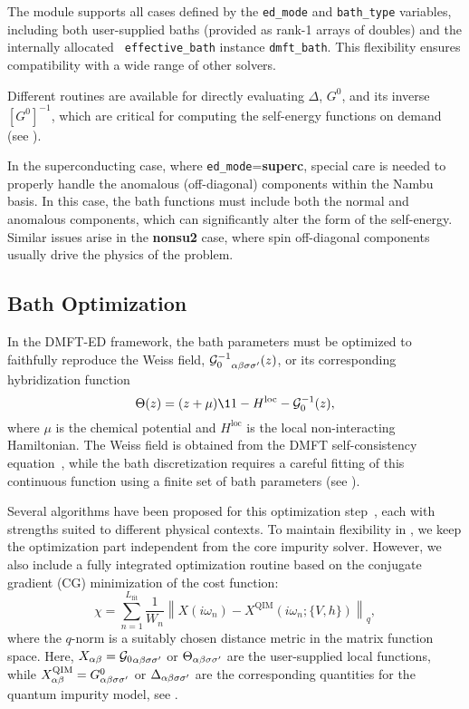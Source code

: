 \documentclass[edipack_sp.tex]{subfiles}
\begin{document}
The module supports all cases defined by the {\tt ed\_mode} and 
{\tt bath\_type} variables, including both user-supplied baths (provided 
as rank-1 arrays of doubles) and the internally allocated {\tt 
effective\_bath} instance {\tt dmft\_bath}. This flexibility ensures 
compatibility with a wide range of other solvers.

Different routines are available for directly evaluating $\Delta$, 
$G^0$, and its inverse $[G^0]^{-1}$, which are critical for computing 
the self-energy functions on demand (see ). 

In the superconducting case, where {\tt ed\_mode}={\bf superc}, 
special care is needed to properly handle the anomalous (off-diagonal) 
components within the Nambu basis. In this case, the bath functions 
must include both the normal and anomalous components, 
which can significantly alter the form of the self-energy. Similar issues arise in the {\bf nonsu2} case, where spin off-diagonal components usually drive the physics of the problem.




\subsection{Bath Optimization}\label{sSecFit}
In the DMFT-ED framework, the bath parameters must be optimized to 
faithfully reproduce the Weiss field, 
${{\cal G}^{-1}_{0}}_{\alpha\beta\sigma\sigma'}(z)$, or its corresponding hybridization 
function 
\begin{equation}
\Theta(z) = (z + \mu)\11 - H^\mathrm{loc} - \GG_0^{-1}(z),
\end{equation}
where $\mu$ is the chemical potential and $H^\mathrm{loc}$ is the 
local non-interacting Hamiltonian. The Weiss field is obtained from the DMFT 
self-consistency equation~\cite{Georges1996RMP}, while the bath 
discretization requires a careful fitting of this continuous function 
using a finite set of bath parameters (see ).

Several algorithms have been proposed for this optimization 
step~\cite{Garcia2004PRL,Taranto2012PRB,Mejuto_Bath_ASCI-DMFT}, each with strengths suited 
to different physical contexts. To maintain flexibility in \NAME, 
we keep the optimization part independent 
from the core impurity solver. However, we also include a fully 
integrated optimization routine based on the conjugate gradient (CG) 
minimization of the cost function:
\begin{equation}
\chi = \sum_{n=1}^{L_\mathrm{fit}} 
\frac{1}{W_n} \left\|X(i\omega_n) - 
X^\mathrm{QIM}(i\omega_n; \{V, h\}) \right\|_q,
\label{eq:chiq}
\end{equation}
where the $q$-norm is a suitably chosen distance metric in the 
matrix function space. Here, $X_{\alpha\beta} = {{\cal G}_{0}}_{\alpha\beta\sigma\sigma'}$ or 
$\Theta_{\alpha\beta\sigma\sigma'}$ are the user-supplied local functions, while 
$X_{\alpha\beta}^\mathrm{QIM} = G^0_{\alpha\beta\sigma\sigma'}$ or 
$\Delta_{\alpha\beta\sigma\sigma'}$ are the corresponding quantities for the quantum 
impurity model, see .
\end{document}
